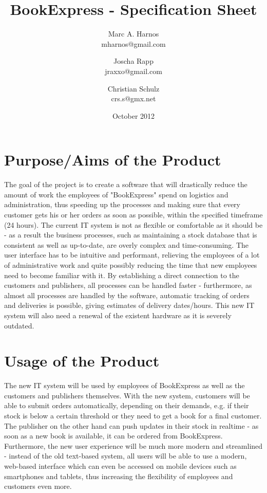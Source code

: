 \documentclass[a4paper,draft]{article}
\author{Marc A. Harnos\\mharnos@gmail.com \and Joscha Rapp\\jraxxo@gmail.com \and Christian Schulz\\crs.s@gmx.net}
\begin{document}
\title{BookExpress - Specification Sheet}
\date{October 2012}
\maketitle
\clearpage
\tableofcontents
\clearpage

\section{Purpose/Aims of the Product}
The goal of the project is to create a software that will drastically reduce the amount of work the employees of "BookExpress" spend on logistics and administration, thus speeding up the processes and making sure that every customer gets his or her orders as soon as possible, within the specified timeframe (24 hours). The current IT system is not as flexible or comfortable as it should be - as a result the business processes, such as maintaining a stock database that is consistent as well as up-to-date, are overly complex and time-consuming. The user interface has to be intuitive and performant, relieving the employees of a lot of administrative work and quite possibly reducing the time that new employees need to become familiar with it. By establishing a direct connection to the customers and publishers, all processes can be handled faster - furthermore, as almost all processes are handled by the software, automatic tracking of orders and deliveries is possible, giving estimates of delivery dates/hours. This new IT system will also need a renewal of the existent hardware as it is severely outdated. 
\\
\section{Usage of the Product}
The new IT system will be used by employees of BookExpress as well as the customers and publishers themselves. With the new system, customers will be able to submit orders automatically, depending on their demands, e.g. if their stock is below a certain threshold or they need to get a book for a final customer. The publisher on the other hand can push updates in their stock in realtime - as soon as a new book is available, it can be ordered from BookExpress. Furthermore, the new user experience will be much more modern and streamlined - instead of the old text-based system, all users will be able to use a modern, web-based interface which can even be accessed on mobile devices such as smartphones and tablets, thus increasing the flexibility of employees and customers even more.
\\
\clearpage
\end{document}
